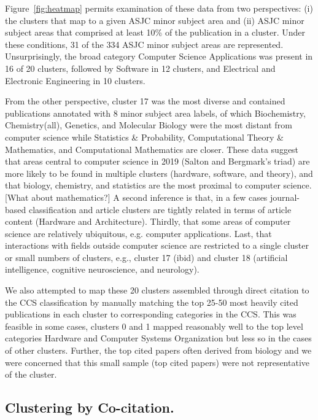 Figure~\ref{fig:heatmap} permits examination of these data from two perspectives: (i) the clusters that map to a given ASJC minor subject area and (ii) ASJC minor subject areas that comprised at least 10\% of the publication in a cluster. Under these conditions, 31 of the 334 ASJC minor subject areas are represented. Unsurprisingly, the broad category Computer Science Applications was present in 16 of 20 clusters, followed by Software in 12 clusters, and Electrical and Electronic Engineering in 10 clusters. 

From the other perspective, cluster 17 was the most diverse and contained publications annotated with 8 minor subject area labels, of which Biochemistry, Chemistry(all), Genetics, and Molecular Biology were the most distant from computer science while Statistics \& Probability, Computational Theory \& Mathematics, and Computational Mathematics are closer.  These data suggest that areas central to computer science in 2019 (Salton and Bergmark's triad) are more likely to be found in multiple clusters (hardware, software, and theory), and that biology, chemistry, and statistics are the most proximal to computer science. [What about mathematics?]  A second inference is that, in a few cases journal-based classification and article clusters are tightly related in terms of article content (Hardware and Architecture). Thirdly, that some areas of computer science are relatively ubiquitous, e.g. computer applications. Last, that interactions with fields outside computer science are restricted to a single cluster or small numbers of clusters, e.g., cluster 17 (ibid) and cluster 18 (artificial intelligence, cognitive neuroscience, and neurology).

We also attempted to map these 20 clusters assembled through direct citation to the CCS classification by manually matching the top 25-50 most heavily cited publications in each cluster to corresponding categories in the CCS. This was feasible in some cases, clusters 0 and 1 mapped reasonably well to the top level categories Hardware and Computer Systems Organization but less so in the cases of other clusters. Further, the top cited papers often derived from biology and we were concerned that this small sample (top cited papers) were not representative of the cluster. 

\subsection{Clustering by Co-citation.} 

